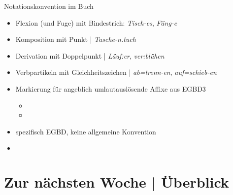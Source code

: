 \begin{frame}
  {Notationskonvention im Buch}
  \pause
  \begin{itemize}[<+->]
    \item \alert{Flexion (und Fuge)} mit Bindestrich: \textit{Tisch-es}, \textit{Fäng-e}
    \item \alert{Komposition} mit Punkt | \textit{Tasche-n.tuch}
    \item \alert{Derivation} mit Doppelpunkt | \textit{Läuf:er}, \textit{ver:blühen}
    \item \alert{Verbpartikeln} mit Gleichheitszeichen | \textit{ab=trenn-en}, \textit{auf=schieb-en}
    \Halbzeile
  \item Markierung für angeblich umlautauslösende Affixe aus EGBD3 
      \begin{itemize}[<+->]
        \item {}
        \item {}
      \end{itemize}
    \Halbzeile
  \item spezifisch EGBD, keine allgemeine Konvention
  \item {}
  \end{itemize}
\end{frame}


\section{Zur nächsten Woche | Überblick}

